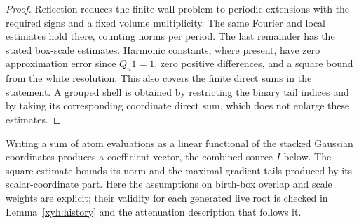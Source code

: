 \begin{proof}
Reflection reduces the finite wall problem to periodic extensions
with the required signs and a fixed volume multiplicity. The same
Fourier and local estimates hold there, counting norms per period.
The last remainder has the stated box-scale estimates. Harmonic
constants, where present, have zero approximation error since
$Q_u1=1$, zero positive differences, and a square bound from the
white resolution. This also covers the finite direct sums in the
statement. A grouped shell is obtained by restricting the binary
tail indices and by taking its corresponding coordinate direct
sum, which does not enlarge these estimates.
\end{proof}

Writing a sum of atom evaluations as a linear functional of the stacked
Gaussian coordinates produces a coefficient vector, the combined
source $I$ below.  The square estimate bounds its norm and the maximal
gradient tails produced by its scalar-coordinate part.  Here the assumptions
on birth-box overlap and scale weights are explicit; their validity for
each generated live root is checked in Lemma~\ref{xyh:history} and the
attenuation description that follows it.

